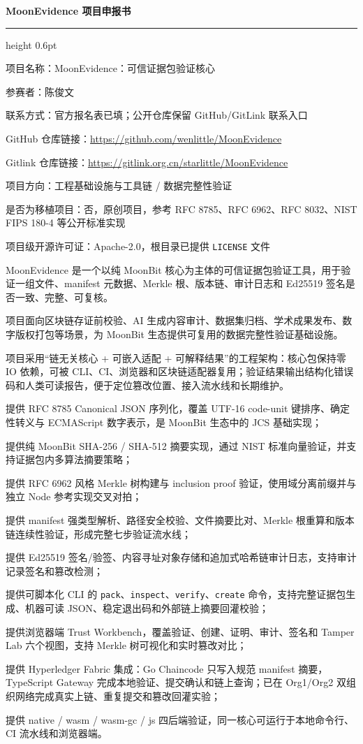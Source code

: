 \documentclass[10pt,a4paper]{article}
\newcommand{\docline}[1]{{\color{ink}#1\par}}
\newcommand{\sect}[1]{\vspace{3pt}{\normalsize\bfseries\color{ink}#1}\par\vspace{1pt}}
\begin{document}
{\Large\bfseries MoonEvidence 项目申报书}\par
\vspace{4pt}
{\color{rulegray}\hrule height 0.6pt}
\vspace{5pt}

\sect{基本信息}

\docline{项目名称：MoonEvidence：可信证据包验证核心}
\docline{参赛者：陈俊文}
\docline{联系方式：官方报名表已填；公开仓库保留 GitHub/GitLink 联系入口}
\docline{GitHub 仓库链接：\href{https://github.com/wenlittle/MoonEvidence}{https://github.com/wenlittle/MoonEvidence}}
\docline{Gitlink 仓库链接：\href{https://gitlink.org.cn/starlittle/MoonEvidence}{https://gitlink.org.cn/starlittle/MoonEvidence}}
\docline{项目方向：工程基础设施与工具链 / 数据完整性验证}
\docline{是否为移植项目：否，原创项目，参考 RFC 8785、RFC 6962、RFC 8032、NIST FIPS 180-4 等公开标准实现}
\docline{项目级开源许可证：Apache-2.0，根目录已提供 \texttt{LICENSE} 文件}

\sect{项目简介}

\docline{MoonEvidence 是一个以纯 MoonBit 核心为主体的可信证据包验证工具，用于验证一组文件、manifest 元数据、Merkle 根、版本链、审计日志和 Ed25519 签名是否一致、完整、可复核。}

\docline{项目面向区块链存证前校验、AI 生成内容审计、数据集归档、学术成果发布、数字版权打包等场景，为 MoonBit 生态提供可复用的数据完整性验证基础设施。}

\docline{项目采用“链无关核心 + 可嵌入适配 + 可解释结果”的工程架构：核心包保持零 IO 依赖，可被 CLI、CI、浏览器和区块链适配器复用；验证结果输出结构化错误码和人类可读报告，便于定位篡改位置、接入流水线和长期维护。}

\sect{核心功能范围}

\docline{提供 RFC 8785 Canonical JSON 序列化，覆盖 UTF-16 code-unit 键排序、确定性转义与 ECMAScript 数字表示，是 MoonBit 生态中的 JCS 基础实现；}
\docline{提供纯 MoonBit SHA-256 / SHA-512 摘要实现，通过 NIST 标准向量验证，并支持证据包内多算法摘要策略；}
\docline{提供 RFC 6962 风格 Merkle 树构建与 inclusion proof 验证，使用域分离前缀并与独立 Node 参考实现交叉对拍；}
\docline{提供 manifest 强类型解析、路径安全校验、文件摘要比对、Merkle 根重算和版本链连续性验证，形成完整七步验证流水线；}
\docline{提供 Ed25519 签名/验签、内容寻址对象存储和追加式哈希链审计日志，支持审计记录签名和篡改检测；}
\docline{提供可脚本化 CLI 的 \texttt{pack}、\texttt{inspect}、\texttt{verify}、\texttt{create} 命令，支持完整证据包生成、机器可读 JSON、稳定退出码和外部链上摘要回灌校验；}
\docline{提供浏览器端 Trust Workbench，覆盖验证、创建、证明、审计、签名和 Tamper Lab 六个视图，支持 Merkle 树可视化和实时篡改对比；}
\docline{提供 Hyperledger Fabric 集成：Go Chaincode 只写入规范 manifest 摘要，TypeScript Gateway 完成本地验证、提交确认和链上查询；已在 Org1/Org2 双组织网络完成真实上链、重复提交和篡改回灌实验；}
\docline{提供 native / wasm / wasm-gc / js 四后端验证，同一核心可运行于本地命令行、CI 流水线和浏览器端。}
\end{document}
